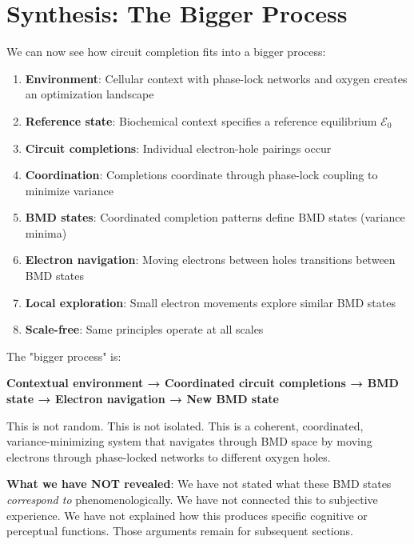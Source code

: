 \documentclass[12pt,a4paper]{article}
\begin{document}
\section{Synthesis: The Bigger Process}

We can now see how circuit completion fits into a bigger process:

\begin{enumerate}
\item \textbf{Environment}: Cellular context with phase-lock networks and oxygen creates an optimization landscape

\item \textbf{Reference state}: Biochemical context specifies a reference equilibrium $\mathcal{E}_0$

\item \textbf{Circuit completions}: Individual electron-hole pairings occur

\item \textbf{Coordination}: Completions coordinate through phase-lock coupling to minimize variance

\item \textbf{BMD states}: Coordinated completion patterns define BMD states (variance minima)

\item \textbf{Electron navigation}: Moving electrons between holes transitions between BMD states

\item \textbf{Local exploration}: Small electron movements explore similar BMD states

\item \textbf{Scale-free}: Same principles operate at all scales
\end{enumerate}

The "bigger process" is:
\begin{center}
\textbf{Contextual environment → Coordinated circuit completions → BMD state → Electron navigation → New BMD state}
\end{center}

This is not random. This is not isolated. This is a coherent, coordinated, variance-minimizing system that navigates through BMD space by moving electrons through phase-locked networks to different oxygen holes.

\textbf{What we have NOT revealed}: We have not stated what these BMD states \textit{correspond to} phenomenologically. We have not connected this to subjective experience. We have not explained how this produces specific cognitive or perceptual functions. Those arguments remain for subsequent sections.
\end{document}
